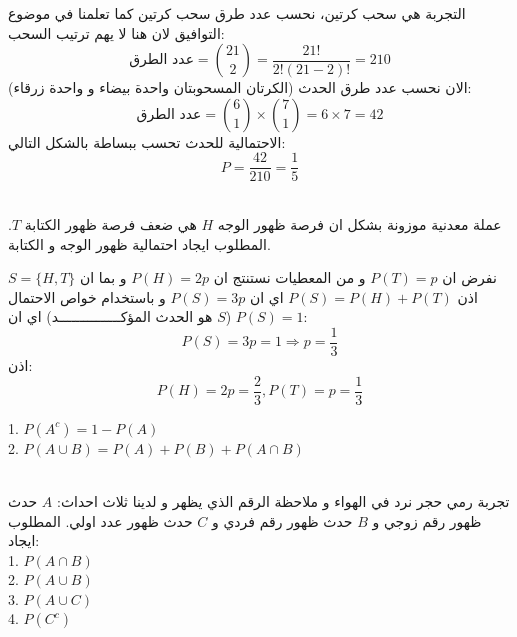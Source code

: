 \begin{solution}
	التجربة هي سحب كرتين، نحسب عدد طرق سحب كرتين كما تعلمنا في موضوع التوافيق لان هنا لا يهم ترتيب السحب:
	\[
	\text{عدد الطرق} = \binom{21}{2} = \frac{21!}{2!(21-2)!} = 210
	\]
	الان نحسب عدد طرق الحدث (الكرتان المسحوبتان واحدة بيضاء و واحدة زرقاء):
	\[
	\text{عدد الطرق} = \binom{6}{1} \times \binom{7}{1} = 6 \times 7 = 42
	\]
	الاحتمالية للحدث تحسب ببساطة بالشكل التالي:
	\[
	P = \frac{42}{210} = \frac{1}{5}
	\]
\end{solution}

\begin{example}
	\\
	عملة معدنية موزونة بشكل ان فرصة ظهور الوجه \(H\) هي ضعف فرصة ظهور الكتابة \(T\). المطلوب ايجاد احتمالية ظهور الوجه و الكتابة. 
\end{example}

\begin{solution}
	نفرض ان \(P(T) = p\) و من المعطيات نستنتج ان \(P(H) = 2p\) و بما ان \(S= \{H, T\}\) اذن \(P(S) = P(H) + P(T)\) اي ان \(P(S) = 3p\) و باستخدام خواص الاحتمال \(P(S) = 1\) (\(S\) هو الحدث المؤكـــــــــــــــد) اي ان:
	\[
	P(S) = 3p = 1 \Rightarrow p =\frac{1}{3}
	\]
	اذن:
	\[
	P(H) = 2p = \frac{2}{3}, P(T) = p = \frac{1}{3}
	\]
\end{solution}

\begin{theorem}
	1. \(P(A^c) = 1 - P(A)\)\\
	2. \(P(A \cup B) = P(A) + P(B) + P(A \cap B)\)
\end{theorem}

\begin{example}
	\\
	تجربة رمي حجر نرد في الهواء و ملاحظة الرقم الذي يظهر و لدينا ثلاث احداث: \(A\) حدث ظهور رقم زوجي و \(B\) حدث ظهور رقم فردي و \(C\) حدث ظهور عدد اولي. المطلوب ايجاد:\\
	1. \(P(A \cap B)\)\\
	2. \(P(A \cup B)\)\\
	3. \(P(A \cup C)\)\\
	4. \(P(C^c)\)
\end{example}

